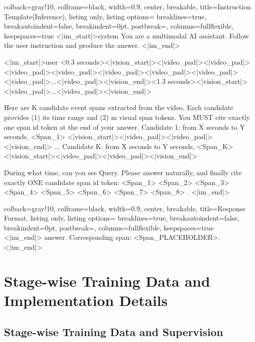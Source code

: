\documentclass{article}
\theoremstyle{plain}
\theoremstyle{definition}
\theoremstyle{remark}
\begin{document}
\begin{tcblisting}{
  colback=gray!10,
  colframe=black,
  width=0.9\textwidth,
  center,
  breakable,
  title={Instruction Template(Inference)},
  listing only,
  listing options={
    breaklines=true,
    breakautoindent=false,
    breakindent=0pt,
    postbreak=\mbox{},
    columns=fullflexible,
    keepspaces=true
  }
}
<|im_start|>system
You are a multimodal AI assistant. Follow the user instruction and produce the answer.
<|im_end|>

<|im_start|>user
<0.3 seconds><|vision_start|><|video_pad|><|video_pad|><|video_pad|><|video_pad|><|video_pad|><|video_pad|><|video_pad|><|video_pad|>...<|video_pad|><|vision_end|><1.3 seconds><|vision_start|><|video_pad|>...<|video_pad|><|vision_end|>

Here are {K} candidate event spans extracted from the video. Each candidate provides (1) its time range and (2) {m} visual span tokens. You MUST cite exactly one span id token at the end of your answer.
Candidate {1}: from X seconds to Y seconds, <Span_1> <|vision_start|><|video_pad|><|video_pad|><|vision_end|>
...
Candidate {K}: from X seconds to Y seconds, <Span_{K}> <|vision_start|><|video_pad|><|video_pad|><|vision_end|>

During what time, can you see {Query}. Please answer naturally, and finally cite exactly ONE candidate span id token: <Span_1> <Span_2> <Span_3> <Span_4> <Span_5> <Span_6> <Span_7> <Span_8> .
<|im_end|>
\end{tcblisting}

\begin{tcblisting}{
  colback=gray!10,
  colframe=black,
  width=0.9\textwidth,
  center,
  breakable,
  title={Response Format},
  listing only,
  listing options={
    breaklines=true,
    breakautoindent=false,
    breakindent=0pt,
    postbreak=\mbox{},
    columns=fullflexible,
    keepspaces=true
  }
}
<|im_end|>
{answer}. Corresponding span: <Span_PLACEHOLDER>. 
<|im_end|>
\end{tcblisting}

\section{Stage-wise Training Data and Implementation Details}
\label{app:stage_data}

\subsection{Stage-wise Training Data and Supervision}
\label{app:stage_training_data}
\end{document}
